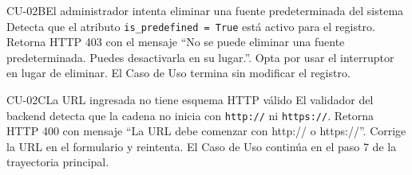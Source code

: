 \begin{UCtrayectoriaA}{CU-02}{B}{El administrador intenta eliminar una fuente predeterminada del sistema}
	\UCpaso[\UCsist] Detecta que el atributo \texttt{is\_predefined = True} está activo para el registro.
	\UCpaso[\UCsist] Retorna HTTP 403 con el mensaje ``No se puede eliminar una fuente predeterminada. Puedes desactivarla en su lugar.''.
	\UCpaso[\UCActor] Opta por usar el interruptor  en lugar de eliminar.
	\UCpaso[] El Caso de Uso termina sin modificar el registro.
\end{UCtrayectoriaA}

\begin{UCtrayectoriaA}{CU-02}{C}{La URL ingresada no tiene esquema HTTP válido}
	\UCpaso[\UCsist] El validador del backend detecta que la cadena no inicia con \texttt{http://} ni \texttt{https://}.
	\UCpaso[\UCsist] Retorna HTTP 400 con mensaje ``La URL debe comenzar con http:// o https://''.
	\UCpaso[\UCActor] Corrige la URL en el formulario y reintenta.
	\UCpaso[] El Caso de Uso continúa en el paso 7 de la trayectoria principal.
\end{UCtrayectoriaA}
